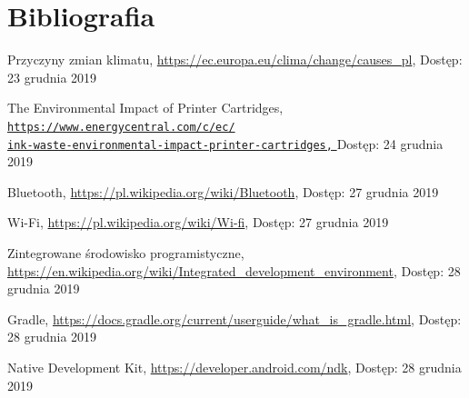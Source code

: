 \documentclass[a4paper,12pt, twoside]{article}
\begin{document}
    	\newpage
    	\section{Bibliografia}
    	
     	\begingroup
    	\renewcommand{\section}[2]{}
    	\begin{thebibliography}{}
    		
    		Przyczyny zmian klimatu,
    		\newline\url{https://ec.europa.eu/clima/change/causes\_pl}, 
    		\newline Dostęp: 23 grudnia 2019
    		
    		The Environmental Impact of Printer Cartridges,
    		\newline\href{https://www.energycentral.com/c/ec/ink-waste-environmental-impact-printer-cartridges}
    		 {\nolinkurl{https://www.energycentral.com/c/ec/}
                 \\
                  \nolinkurl{ink-waste-environmental-impact-printer-cartridges,}
                 }
    		\newline Dostęp: 24 grudnia 2019
    		
    		Bluetooth,
    		\newline\url{https://pl.wikipedia.org/wiki/Bluetooth}, 
    		\newline Dostęp: 27 grudnia 2019
    			
    		Wi-Fi,
    		\newline\url{https://pl.wikipedia.org/wiki/Wi-fi}, 
    		\newline Dostęp: 27 grudnia 2019
    		
    		Zintegrowane środowisko programistyczne,
    		\newline\url{https://en.wikipedia.org/wiki/Integrated_development_environment}, 
    		\newline Dostęp: 28 grudnia 2019
    		
    		Gradle,
    		\newline\url{https://docs.gradle.org/current/userguide/what_is_gradle.html}, 
    		\newline Dostęp: 28 grudnia 2019
    		
    		Native Development Kit,
    		\newline\url{https://developer.android.com/ndk}, 
    		\newline Dostęp: 28 grudnia 2019
    		

\end{thebibliography}
\end{document}
